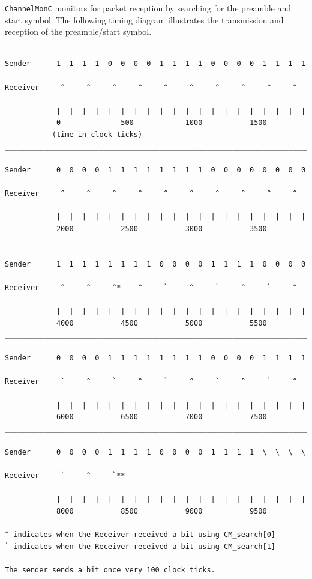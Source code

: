 \documentclass[11pt]{article}
\begin{document}
{\tt ChannelMonC} monitors for packet reception by searching for the preamble and
start symbol. The following timing diagram illustrates the
transmission and reception of the preamble/start symbol.
\newpage
\small
\begin{verbatim}

Sender      1  1  1  1  0  0  0  0  1  1  1  1  0  0  0  0  1  1  1  1

Receiver     ^     ^     ^     ^     ^     ^     ^     ^     ^     ^            

            |  |  |  |  |  |  |  |  |  |  |  |  |  |  |  |  |  |  |  |   
            0              500            1000           1500		
           (time in clock ticks)
__________________________________________________________________________

Sender      0  0  0  0	1  1  1	 1  1  1  1  1  0  0  0  0  0  0  0  0

Receiver     ^     ^     ^     ^     ^     ^     ^     ^     ^     ^            

            |  |  |  |  |  |  |  |  |  |  |  |  |  |  |  |  |  |  |  |   
            2000           2500           3000           3500		
__________________________________________________________________________

Sender      1  1  1  1	1  1  1	 1  0  0  0  0  1  1  1  1  0  0  0  0

Receiver     ^     ^     ^*    ^     `     ^     `     ^     `     ^            

            |  |  |  |  |  |  |  |  |  |  |  |  |  |  |  |  |  |  |  |   
            4000           4500           5000           5500		
__________________________________________________________________________

Sender      0  0  0  0	1  1  1	 1  1  1  1  1  0  0  0  0  1  1  1  1

Receiver     `     ^     `     ^     `     ^     `     ^     `     ^            

            |  |  |  |  |  |  |  |  |  |  |  |  |  |  |  |  |  |  |  |   
            6000           6500           7000           7500		
__________________________________________________________________________

Sender      0  0  0  0	1  1  1	 1  0  0  0  0  1  1  1  1  \  \  \  \

Receiver     `     ^     `**   

            |  |  |  |  |  |  |  |  |  |  |  |  |  |  |  |  |  |  |  |   
            8000           8500           9000           9500		

^ indicates when the Receiver received a bit using CM_search[0]
` indicates when the Receiver received a bit using CM_search[1]

The sender sends a bit once very 100 clock ticks.

\end{verbatim}
\end{document}

